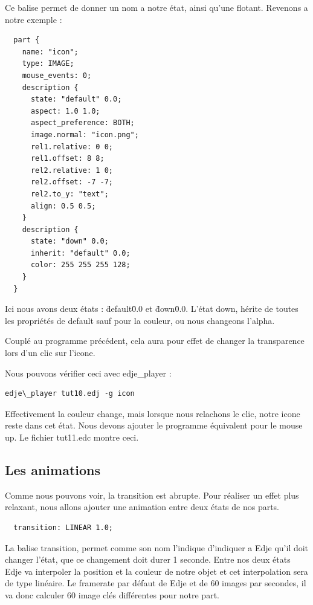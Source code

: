 \documentclass[a4paper]{efr}
\begin{document}
Ce balise permet de donner un nom a notre état, ainsi qu'une flotant.
Revenons a notre exemple :

\begin{lstlisting}
  part {
    name: "icon";
    type: IMAGE;
    mouse_events: 0;
    description {
      state: "default" 0.0;
      aspect: 1.0 1.0;
      aspect_preference: BOTH;
      image.normal: "icon.png";
      rel1.relative: 0 0;
      rel1.offset: 8 8;
      rel2.relative: 1 0;
      rel2.offset: -7 -7;
      rel2.to_y: "text";
      align: 0.5 0.5;
    }
    description {
      state: "down" 0.0;
      inherit: "default" 0.0;
      color: 255 255 255 128;
    }
  }
\end{lstlisting}

Ici nous avons deux états : \"default\" 0.0 et \"down\" 0.0.
L'état down, hérite de toutes les propriétés de default sauf pour la couleur, ou
nous changeons l'alpha.

Couplé au programme précédent, cela aura pour effet de changer la transparence
lors d'un clic sur l'icone.

Nous pouvons vérifier ceci avec edje\_player :
\begin{lstlisting}
edje\_player tut10.edj -g icon
\end{lstlisting}

Effectivement la couleur change, mais lorsque nous relachons le clic, notre
icone reste dans cet état. Nous devons ajouter le programme équivalent pour le
mouse up. Le fichier tut11.edc montre ceci.

\subsection{Les animations}
Comme nous pouvons voir, la transition est abrupte. Pour réaliser un effet plus
relaxant, nous allons ajouter une animation entre deux états de nos parts.

\begin{lstlisting}
  transition: LINEAR 1.0;
\end{lstlisting}

La balise transition, permet comme son nom l'indique d'indiquer a Edje qu'il
doit changer l'état, que ce changement doit durer 1 seconde.
Entre nos deux états Edje va interpoler la position et la couleur de notre
objet et cet interpolation sera de type linéaire. Le framerate par défaut de
Edje et de 60 images par secondes, il va donc calculer 60 image clés différentes
pour notre part.
\end{document}
